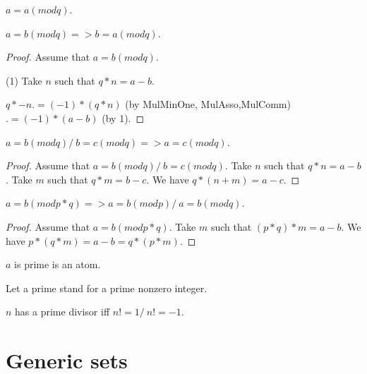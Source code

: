 \documentclass{article}
\begin{document}
\begin{forthel}
    \begin{lemma}[EquModRef]
      $a = a (mod q)$.
    \end{lemma}

    \begin{lemma}[EquModSym]
      $a = b (mod q) => b = a (mod q)$.
    \end{lemma}
    \begin{proof}
      Assume that $a = b (mod q)$.

      (1) Take $n$ such that $q * n = a - b$.

      $q * -n .= (-1) * (q * n)$ (by MulMinOne, MulAsso,MulComm) $.= (-1) * (a - b)$ (by 1).
    \end{proof}

    \begin{lemma}[EquModTrn]
      $a = b (mod q) /\ b = c (mod q) => a = c (mod q)$.
    \end{lemma}
    \begin{proof}
      Assume that $a = b (mod q) /\ b = c (mod q)$. Take $n$ such that $q * n = a - b$. Take $m$ such that $q * m = b - c$. We have $q * (n + m) = a - c$.
    \end{proof}

    \begin{lemma}[EquModMul]
      $a = b (mod p * q) => a = b (mod p) /\ a = b (mod q)$.
    \end{lemma}
    \begin{proof}
      Assume that $a = b (mod p * q)$. Take $m$ such that $(p * q) * m = a - b$. We have $p * (q * m) = a - b = q * (p * m)$.
    \end{proof}

    \begin{signature}[Prime]
      $a$ is prime is an atom.
    \end{signature}

    Let a prime stand for a prime nonzero integer.

    \begin{axiom}[PrimeDivisor]
      $n$ has a prime divisor iff $n != 1 /\ n != -1$.
    \end{axiom}
  \end{forthel}


  \section{Generic sets}
\end{document}
